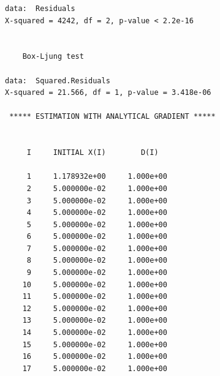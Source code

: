 \documentclass[11pt]{article}\usepackage[]{graphicx}\usepackage[]{color}
\makeatletter
\newenvironment{kframe}{%
 \def\at@end@of@kframe{}%
 \ifinner\ifhmode%
  \def\at@end@of@kframe{\end{minipage}}%
  \begin{minipage}{\columnwidth}%
 \fi\fi%
 \def\FrameCommand##1{\hskip\@totalleftmargin \hskip-\fboxsep
 \colorbox{shadecolor}{##1}\hskip-\fboxsep
     \hskip-\linewidth \hskip-\@totalleftmargin \hskip\columnwidth}%
 \MakeFramed {\advance\hsize-\width
   \@totalleftmargin\z@ \linewidth\hsize
   \@setminipage}}%
 {\par\unskip\endMakeFramed%
 \at@end@of@kframe}
\newenvironment{knitrout}{}{} %
\makeatother
\begin{document}
\begin{knitrout}
\begin{kframe}
\begin{verbatim}
data:  Residuals
X-squared = 4242, df = 2, p-value < 2.2e-16


	Box-Ljung test

data:  Squared.Residuals
X-squared = 21.566, df = 1, p-value = 3.418e-06

 ***** ESTIMATION WITH ANALYTICAL GRADIENT ***** 


     I     INITIAL X(I)        D(I)

     1     1.178932e+00     1.000e+00
     2     5.000000e-02     1.000e+00
     3     5.000000e-02     1.000e+00
     4     5.000000e-02     1.000e+00
     5     5.000000e-02     1.000e+00
     6     5.000000e-02     1.000e+00
     7     5.000000e-02     1.000e+00
     8     5.000000e-02     1.000e+00
     9     5.000000e-02     1.000e+00
    10     5.000000e-02     1.000e+00
    11     5.000000e-02     1.000e+00
    12     5.000000e-02     1.000e+00
    13     5.000000e-02     1.000e+00
    14     5.000000e-02     1.000e+00
    15     5.000000e-02     1.000e+00
    16     5.000000e-02     1.000e+00
    17     5.000000e-02     1.000e+00


\end{verbatim}
\end{kframe}
\end{knitrout}
\end{document}
